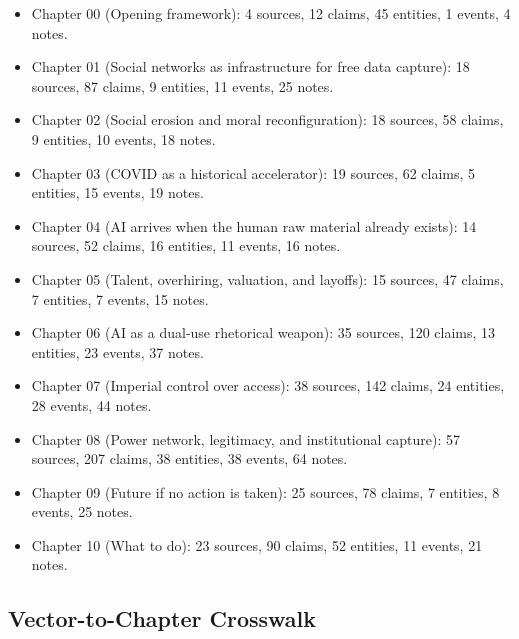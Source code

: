 \documentclass[
  american,
  11pt,
  letterpaper,
]{article}
\providecommand{\tightlist}{%
  \setlength{\itemsep}{0pt}\setlength{\parskip}{0pt}}
\begin{document}
\begin{itemize}
\tightlist
\item
  Chapter 00 (Opening framework): 4 sources, 12 claims, 45 entities, 1
  events, 4 notes.
\item
  Chapter 01 (Social networks as infrastructure for free data capture):
  18 sources, 87 claims, 9 entities, 11 events, 25 notes.
\item
  Chapter 02 (Social erosion and moral reconfiguration): 18 sources, 58
  claims, 9 entities, 10 events, 18 notes.
\item
  Chapter 03 (COVID as a historical accelerator): 19 sources, 62 claims,
  5 entities, 15 events, 19 notes.
\item
  Chapter 04 (AI arrives when the human raw material already exists): 14
  sources, 52 claims, 16 entities, 11 events, 16 notes.
\item
  Chapter 05 (Talent, overhiring, valuation, and layoffs): 15 sources,
  47 claims, 7 entities, 7 events, 15 notes.
\item
  Chapter 06 (AI as a dual-use rhetorical weapon): 35 sources, 120
  claims, 13 entities, 23 events, 37 notes.
\item
  Chapter 07 (Imperial control over access): 38 sources, 142 claims, 24
  entities, 28 events, 44 notes.
\item
  Chapter 08 (Power network, legitimacy, and institutional capture): 57
  sources, 207 claims, 38 entities, 38 events, 64 notes.
\item
  Chapter 09 (Future if no action is taken): 25 sources, 78 claims, 7
  entities, 8 events, 25 notes.
\item
  Chapter 10 (What to do): 23 sources, 90 claims, 52 entities, 11
  events, 21 notes.
\end{itemize}

\subsection{Vector-to-Chapter
Crosswalk}\label{vector-to-chapter-crosswalk}
\end{document}
